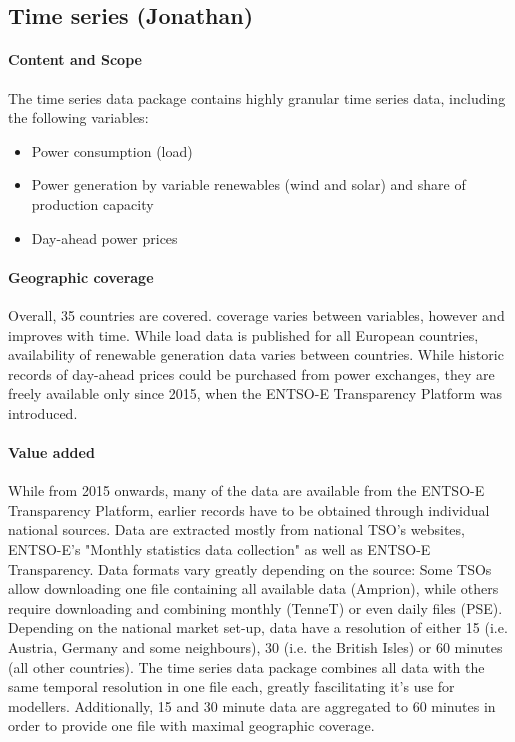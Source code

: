 \documentclass[article]{elsarticle}
\begin{document}
\subsection{Time series (Jonathan)}
\label{subsec:time series}

\paragraph{Content and Scope}
The time series data package contains highly granular time series data, including the following variables:
\begin{itemize}
    \item Power consumption (load)
    \item Power generation by variable renewables (wind and solar) and share of production capacity 
    \item Day-ahead power prices
\end{itemize}

\paragraph{Geographic coverage}
Overall, 35 countries are covered. coverage varies between variables, however and improves with time. While load data is published for all European countries, availability of renewable generation data varies between countries. While historic records of day-ahead prices could be purchased from power exchanges, they are freely available only since 2015, when the ENTSO-E Transparency Platform was introduced.

\paragraph{Value added}
While from 2015 onwards, many of the data are available from the ENTSO-E Transparency Platform, earlier records have to be obtained through individual national sources. Data are extracted mostly from national TSO's websites, ENTSO-E's "Monthly statistics data collection" as well as ENTSO-E Transparency. Data formats vary greatly depending on the source: Some TSOs allow downloading one file containing all available data (Amprion), while others require downloading and combining monthly (TenneT) or even daily files (PSE). Depending on the national market set-up, data have a resolution of either 15 (i.e. Austria, Germany and some neighbours), 30 (i.e. the British Isles) or 60 minutes (all other countries). The time series data package combines all data with the same temporal resolution in one file each, greatly fascilitating it's use for modellers. Additionally, 15 and 30 minute data are aggregated to 60 minutes in order to provide one file with maximal geographic coverage.
\end{document}
